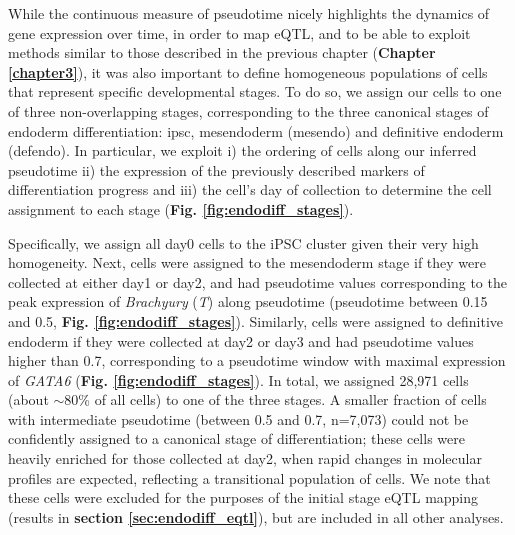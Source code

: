 While the continuous measure of pseudotime nicely highlights the dynamics of gene expression over time, in order to map eQTL, and to be able to exploit methods similar to those described in the previous chapter (\textbf{Chapter 
\ref{chapter3}}),
it was also important to define homogeneous populations of cells that represent specific developmental stages.
To do so, we assign our cells to one of three non-overlapping stages, corresponding to the three canonical stages of endoderm differentiation: \gls{ipsc}, mesendoderm (mesendo) and definitive endoderm (defendo).
In particular, we exploit i) the ordering of cells along our inferred pseudotime ii) the expression of the previously described markers of differentiation progress and iii) the cell's day of collection to determine the cell assignment to each stage (\textbf{Fig. \ref{fig:endodiff_stages}}).

Specifically, we assign all day0 cells to the iPSC cluster given their very high homogeneity.
Next, cells were assigned to the mesendoderm stage if they were collected at either day1 or day2, and had pseudotime values corresponding to the peak expression of \textit{Brachyury} (\textit{T}) along pseudotime (pseudotime between 0.15 and 0.5, \textbf{Fig. \ref{fig:endodiff_stages}}).  
Similarly, cells were assigned to definitive endoderm if they were collected at day2 or day3 and had pseudotime values higher than 0.7, corresponding to a pseudotime window with maximal expression of \textit{GATA6} (\textbf{Fig. \ref{fig:endodiff_stages}}).
In total, we assigned 28,971 cells (about $\sim$80\% of all cells) to one of the three stages. 
A smaller fraction of cells with intermediate pseudotime (between 0.5 and 0.7, n=7,073) could not be confidently assigned to a canonical stage of differentiation; these cells were heavily enriched for those collected at day2, when rapid changes in molecular profiles are expected, reflecting a transitional population of cells.
We note that these cells were excluded for the purposes of the initial stage eQTL mapping (results in \textbf{section \ref{sec:endodiff_eqtl}}), but are included in all other analyses. 

\vspace{2mm}

